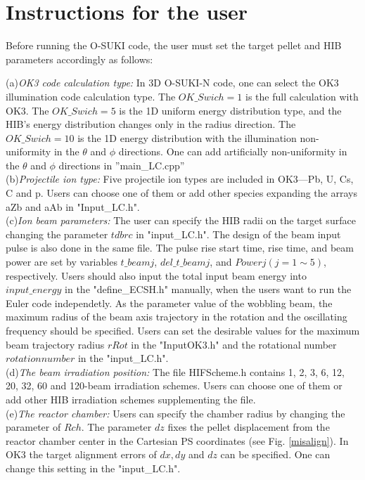 %

\section{Instructions for the user}\par
Before running the O-SUKI code, the user must set the target pellet and HIB parameters accordingly as follows:   \\
\begin{small}%
%
{(a)\em OK3 code calculation type:} In 3D O-SUKI-N code, one can select the OK3 illumination code calculation type. The $OK\_Swich = 1$ is the full calculation with OK3. The $OK\_Swich = 5$ is the 1D uniform energy distribution type, and the HIB's energy distribution changes only in the radius direction. The $OK\_Swich = 10$ is the 1D energy distribution with the illumination non-uniformity in the $\theta$ and $\phi$ directions. One can add artificially non-uniformity in the $\theta$ and $\phi$ directions in ''main\_LC.cpp''\\
%
{(b)\em Projectile ion type:} Five projectile ion types are included in OK3—Pb, U, Cs, C and p. Users can choose one of them or add other species expanding the arrays aZb and aAb in "Input\_LC.h".\\
{(c)\em Ion beam parameters:} The user can specify the HIB radii on the target surface changing the parameter $tdbrc$ in "input\_LC.h". The design of the beam input pulse is also done in the same file. The pulse rise start time, rise time, and beam power are set by variables $t\_beamj$, $del\_t\_beamj$, and $Powerj (j=1\sim5)$, respectively. Users should also input the total input beam energy into $input\_energy$ in the "define\_ECSH.h" manually, when the users want to run the Euler code independetly. As the parameter value of the wobbling beam, the maximum radius of the beam axis trajectory in the rotation and the oscillating frequency should be specified. Users can set the desirable values for the maximum beam trajectory radius $rRot$ in the "InputOK3.h" and the rotational number $rotationnumber$ in the "input\_LC.h".\\
{(d)\em The beam irradiation position:} The file HIFScheme.h contains 1, 2, 3, 6, 12, 20, 32, 60 and 120-beam irradiation schemes. Users can choose one of them or add other HIB irradiation schemes supplementing the file.  \\
{(e)\em The reactor chamber:} Users can specify the chamber radius by changing the parameter of $Rch$. The parameter $dz$ fixes the pellet displacement from the reactor chamber center in the Cartesian PS coordinates (see Fig. \ref{misalign}). In OK3 the target alignment errors of $dx, dy$ and $dz$ can be specified. One can change this setting in the "input\_LC.h".\\

\end{small}
